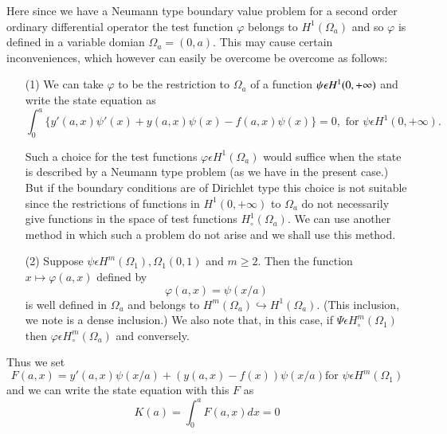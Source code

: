 Here since we have a Neumann type boundary value problem for a second
order ordinary differential operator the test function $\varphi$
belongs to $H^{1} (\Omega_{a})$ and so $\varphi$ is defined in a
variable domian $\Omega_{a} = (0, a)$. This may cause certain
inconveniences, which however can easily be overcome be overcome as
follows: 
\begin{enumerate}
\item[(1)] We can take $\varphi$ to be the restriction to $\Omega_{a}$
  of a function $\psi \epsilon H^{1}\break (0, + \infty)$ and write the
  state equation as 
{\fontsize{10}{12}\selectfont
$$
\int_{0}^{a} \{y' (a, x) \psi' (x) + y(a, x) \psi(x) - f(a, x) \psi
(x)\} = 0, \text{ for } \psi \epsilon H^{1} (0, + \infty). 
$$}

Such a choice for the test functions $\varphi \epsilon H^{1}
(\Omega_{a})$ would suffice when the state is described by a Neumann
type problem (as we have in the present case.) But if the boundary
conditions are of Dirichlet type this choice is not suitable since the
restrictions of functions in $H^{1} (0, + \infty)$ to $\Omega_{a}$ do
not necessarily give functions in the space of test functions
$H_{\circ}^{1} (\Omega_{a})$. We can use another method in which such
a problem do not arise and we shall use this method. 

\item[(2)] Suppose $\psi \epsilon H^{m} (\Omega_{1}), \Omega_{1}(0,
  1)$ and $m \geq 2$. Then the function $x \mapsto \varphi(a, x)$
  defined by 
\begin{equation*}
\varphi (a, x) = \psi (x/a)\tag{2.22}\label{chap6-eq2.22}
\end{equation*}\pageoriginale
is well defined in $\Omega_{a}$ and belongs to $H^{m} (\Omega_{a})
\hookrightarrow H^{1} (\Omega_{a})$. (This inclusion, we note is a
dense inclusion.) We also note that, in this case, if $\Psi \epsilon
H_{\circ}^{m} (\Omega_{1})$ then $\varphi \epsilon H_{\circ}^{m}
(\Omega_{a})$ and conversely. 
\end{enumerate}

Thus we set
\begin{equation*}
F(a, x) = y'(a, x) \psi (x / a) + (y(a, x) -f(x)) \psi (x / a) \text{
  for } \psi \epsilon H^{m}
(\Omega_{1})\tag*{$(2.20)'$}\label{chap6-eq2.20'} 
\end{equation*}
and we can write the state equation with this $F$ as
\begin{equation*}
K(a) = \int_{0}^{a} F(a, x) dx = 0\tag{2.21}
\end{equation*}

